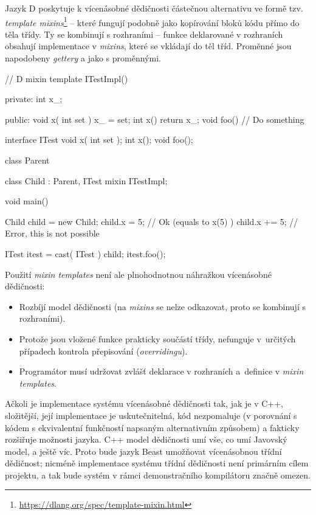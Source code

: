 Jazyk D poskytuje k vícenásobné dědičnosti částečnou alternativu ve formě tzv. \textit{template mixins}\footnote{\url{https://dlang.org/spec/template-mixin.html}} -- které fungují podobně jako kopírování bloků kódu přímo do těla třídy. Ty se kombinují s rozhraními -- funkce deklarované v rozhraních obsahují implementace v \textit{mixins}, které se vkládají do těl tříd. Proměnné jsou napodobeny \textit{gettery} a jako s proměnnými.

\begin{dcode}
// D
mixin template ITestImpl() {

private:
	int x_;
	
public:
	void x( int set ) {
		x_ = set;	
	}
	int x() {
		return x_;	
	}
	void foo() {
		// Do something	
	}

}

interface ITest {
	void x( int set );
	int x();
	void foo();
}

class Parent {
}

class Child : Parent, ITest {
	mixin ITestImpl;
}

void main() {
	Child child = new Child;
	child.x = 5; // Ok (equals to x(5) )
	child.x += 5; // Error, this is not possible
	
	ITest itest = cast( ITest ) child;
	itest.foo();
}
\end{dcode}

Použití \textit{mixin templates} není ale plnohodnotnou náhražkou vícenásobné dědičnosti:
\begin{itemize}
	\item Rozbíjí model dědičnosti (na \textit{mixins} se nelze odkazovat, proto se kombinují s rozhraními).
	\item Protože jsou vložené funkce prakticky součástí třídy, nefunguje v~určitých případech kontrola přepisování (\textit{overridingu}).
	\item Programátor musí udržovat zvlášť deklarace v rozhraních a~definice v \textit{mixin templates}.
\end{itemize}

Ačkoli je implementace systému vícenásobné dědičnosti tak, jak je v C++, složitější, její implementace je uskutečnitelná, kód nezpomaluje (v porovnání s kódem s ekvivalentní funkčností napsaným alternativním způsobem) a fakticky rozšiřuje možnosti jazyka. C++ model dědičnosti umí vše, co umí Javovský model, a ještě víc. Proto bude jazyk Beast umožňovat vícenásobnou třídní dědičnost; nicméně implementace systému třídní dědičnosti není primárním cílem projektu, a tak bude systém v rámci demonstračního kompilátoru značně omezen.

